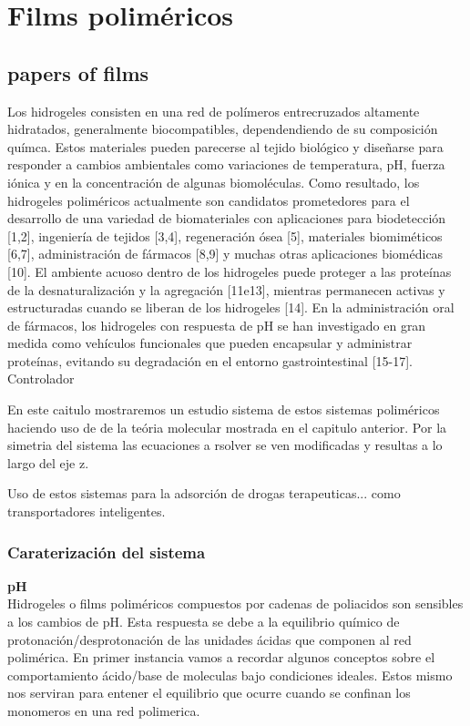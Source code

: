 
\chapter{Films poliméricos} %

\label{Chapter2} %

\section{papers of films}


Los hidrogeles consisten en una red de polímeros entrecruzados altamente hidratados, generalmente biocompatibles, dependendiendo de su composici\'on qu\'imca. Estos materiales pueden parecerse al tejido biológico y diseñarse para responder a cambios ambientales como variaciones de temperatura, pH, fuerza iónica y en la concentración de algunas biomoléculas. Como resultado, los hidrogeles poliméricos actualmente son candidatos prometedores para el desarrollo de una variedad de biomateriales con aplicaciones para biodetección [1,2], ingeniería de tejidos [3,4], regeneración ósea [5], materiales biomiméticos [6,7], administración de fármacos [8,9] y muchas otras aplicaciones biomédicas [10]. El ambiente acuoso dentro de los hidrogeles puede proteger a las proteínas de la desnaturalización y la agregación [11e13], mientras permanecen activas y estructuradas cuando se liberan de los hidrogeles [14]. En la administración oral de fármacos, los hidrogeles con respuesta de pH se han investigado en gran medida como vehículos funcionales que pueden encapsular y administrar proteínas, evitando su degradación en el entorno gastrointestinal [15-17].
Controlador


En este caitulo mostraremos un estudio sistema de estos sistemas polim\'ericos haciendo uso de de la te\'oria molecular mostrada en el capitulo anterior. Por la simetria del sistema las ecuaciones a rsolver se ven modificadas y resultas a lo largo del eje z.

Uso de estos sistemas para la adsorci\'on de drogas terapeuticas... como transportadores inteligentes.

\subsection{Caraterizaci\'on del sistema}
\textbf{pH} \\
Hidrogeles o films poliméricos compuestos por cadenas de poliacidos son sensibles a los cambios de pH. Esta respuesta se debe a la equilibrio químico de protonación/desprotonación de las unidades ácidas que componen al red polimérica. 
En primer instancia vamos a recordar algunos conceptos sobre el comportamiento ácido/base de moleculas bajo condiciones ideales. 
Estos mismo nos serviran para entener el equilibrio que ocurre cuando se confinan los monomeros en una red polimerica.

